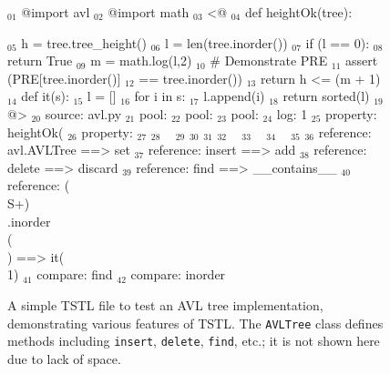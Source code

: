\documentclass{sig-alternate}
\begin{document}
\begin{figure}
\begin{code}
$_{01}$ @import avl
$_{02}$ @import math
\vspace{0.1in}
$_{03}$ <@
$_{04}$ def heightOk(tree):

$_{05}$     h = tree.tree\_height()
$_{06}$     l = len(tree.inorder())
$_{07}$     if (l == 0):
$_{08}$        return True
$_{09}$     m = math.log(l,2)
$_{10}$     \# Demonstrate PRE
$_{11}$     assert (PRE[tree.inorder()] 
$_{12}$             == tree.inorder())
$_{13}$     return h <= (m + 1)
\vspace{0.1in}
$_{14}$ def it(s):
$_{15}$     l = []
$_{16}$     for i in s:
$_{17}$        l.append(i)
$_{18}$     return sorted(l)
$_{19}$ @>
\vspace{0.1in}
$_{20}$ source: avl.py
\vspace{0.1in}
$_{21}$ pool: %
$_{22}$ pool: %
$_{23}$ pool: %
\vspace{0.1in}
$_{24}$ log: 1 %
\vspace{0.1in}
$_{25}$ property: heightOk(%
$_{26}$ property: %
\vspace{0.1in}
$_{27}$ %
$_{28}$ ~%
$_{29}$ %
\vspace{0.1in}
$_{30}$ %
$_{31}$ %
\vspace{0.1in}
$_{32}$ ~%
$_{33}$ ~%
$_{34}$ ~%
$_{35}$ %
\vspace{0.1in}
$_{36}$ reference: avl.AVLTree ==> set
$_{37}$ reference: insert ==> add
$_{38}$ reference: delete ==> discard
$_{39}$ reference: find ==> \_\_contains\_\_
$_{40}$ reference: (\\S+)\\.inorder\\(\\) ==> it(\\1)
\vspace{0.1in}
$_{41}$ compare: find
$_{42}$ compare: inorder
\end{code}
\caption{A simple TSTL file to test an AVL tree implementation,
  demonstrating various features of TSTL.  The {\tt AVLTree} class defines methods including {\tt insert}, {\tt delete}, {\tt find}, etc.; it is not shown here due to lack of space.}
\label{fig:avl}
\end{figure}
\end{document}
